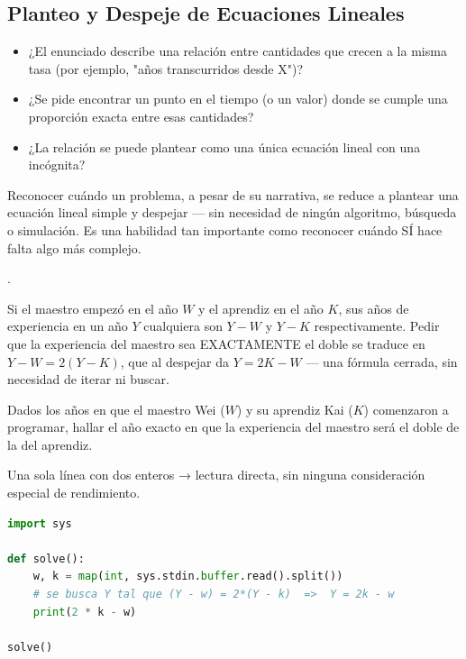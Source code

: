 \subsection{Planteo y Despeje de Ecuaciones Lineales}


\begin{itemize}
\item ¿El enunciado describe una relación entre cantidades que crecen a la misma tasa (por ejemplo, "años transcurridos desde X")?
\item ¿Se pide encontrar un punto en el tiempo (o un valor) donde se cumple una proporción exacta entre esas cantidades?
\item ¿La relación se puede plantear como una única ecuación lineal con una incógnita?
\end{itemize}

 Reconocer cuándo un problema, a pesar de su narrativa, se reduce a plantear una ecuación lineal simple y despejar — sin necesidad de ningún algoritmo, búsqueda o simulación. Es una habilidad tan importante como reconocer cuándo SÍ hace falta algo más complejo.

 .

 Si el maestro empezó en el año $W$ y el aprendiz en el año $K$, sus años de experiencia en un año $Y$ cualquiera son $Y-W$ y $Y-K$ respectivamente. Pedir que la experiencia del maestro sea EXACTAMENTE el doble se traduce en $Y - W = 2(Y-K)$, que al despejar da $Y = 2K - W$ — una fórmula cerrada, sin necesidad de iterar ni buscar.


Dados los años en que el maestro Wei ($W$) y su aprendiz Kai ($K$) comenzaron a programar, hallar el año exacto en que la experiencia del maestro será el doble de la del aprendiz.

 Una sola línea con dos enteros → lectura directa, sin ninguna consideración especial de rendimiento.


\begin{lstlisting}[language=Python]
import sys

def solve():
    w, k = map(int, sys.stdin.buffer.read().split())
    # se busca Y tal que (Y - w) = 2*(Y - k)  =>  Y = 2k - w
    print(2 * k - w)

solve()
\end{lstlisting}
